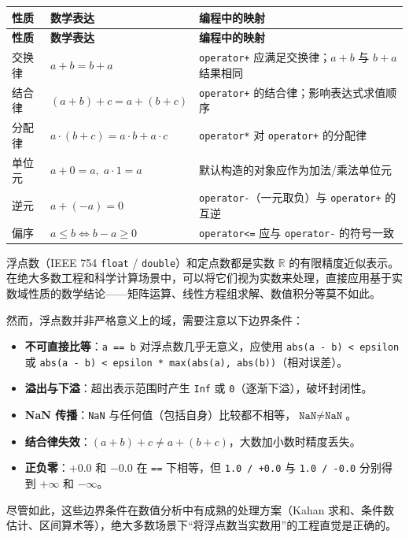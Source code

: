 \documentclass[12pt,a4paper,fontset=fandol]{ctexbook}
\newcommand{\Tp}[1]{\texttt{#1}}
\newcommand{\Op}[1]{\texttt{operator#1}}
\begin{document}
\begin{longtable}{llp{7cm}}
\toprule
\textbf{性质} & \textbf{数学表达} & \textbf{编程中的映射} \\
\midrule
\endfirsthead
\toprule
\textbf{性质} & \textbf{数学表达} & \textbf{编程中的映射} \\
\midrule
\endhead
\bottomrule
\endfoot

交换律 & $a + b = b + a$ & \Op{+} 应满足交换律；$a + b$ 与 $b + a$ 结果相同 \\
结合律 & $(a + b) + c = a + (b + c)$ & \Op{+} 的结合律；影响表达式求值顺序 \\
分配律 & $a \cdot (b + c) = a \cdot b + a \cdot c$ & \Op{*} 对 \Op{+} 的分配律 \\
单位元 & $a + 0 = a,\; a \cdot 1 = a$ & 默认构造的对象应作为加法/乘法单位元 \\
逆元 & $a + (-a) = 0$ & \Op{-}（一元取负）与 \Op{+} 的互逆 \\
偏序 & $a \le b \iff b - a \ge 0$ & \Op{<=} 应与 \Op{-} 的符号一致 \\
\end{longtable}

\begin{warning}[title=浮点数不是域]
浮点数（IEEE 754 \Tp{float} / \Tp{double}）和定点数都是实数 $\mathbb{R}$ 的有限精度近似表示。在绝大多数工程和科学计算场景中，可以将它们视为实数来处理，直接应用基于实数域性质的数学结论——矩阵运算、线性方程组求解、数值积分等莫不如此。

然而，浮点数并非严格意义上的域，需要注意以下边界条件：

\begin{itemize}
  \item \textbf{不可直接比等}：\texttt{a == b} 对浮点数几乎无意义，应使用 \texttt{abs(a - b) < epsilon} 或 \texttt{abs(a - b) < epsilon * max(abs(a), abs(b))}（相对误差）。
  \item \textbf{溢出与下溢}：超出表示范围时产生 \texttt{Inf} 或 \texttt{0}（逐渐下溢），破坏封闭性。
  \item \textbf{NaN 传播}：\texttt{NaN} 与任何值（包括自身）比较都不相等，$\texttt{NaN} \ne \texttt{NaN}$。
  \item \textbf{结合律失效}：$(a + b) + c \ne a + (b + c)$，大数加小数时精度丢失。
  \item \textbf{正负零}：$+0.0$ 和 $-0.0$ 在 \texttt{==} 下相等，但 \texttt{1.0 / +0.0} 与 \texttt{1.0 / -0.0} 分别得到 $+\infty$ 和 $-\infty$。
\end{itemize}

尽管如此，这些边界条件在数值分析中有成熟的处理方案（Kahan 求和、条件数估计、区间算术等），绝大多数场景下``将浮点数当实数用''的工程直觉是正确的。
\end{warning}
\end{document}
